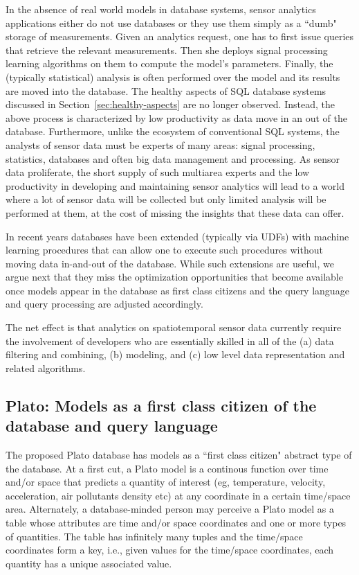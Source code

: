 In the absence of real world models in database systems, sensor analytics applications either do not use databases or they use them simply as a ``dumb" storage of measurements.
Given an analytics request, one has to first issue queries that retrieve the relevant measurements. Then she deploys signal processing learning algorithms on them to compute the model's parameters. Finally,  the (typically statistical) analysis is often performed over the model and its results are moved into the database. 
The healthy aspects of SQL database systems discussed in Section~\ref{sec:healthy-aspects} are no longer observed. Instead, the above process is characterized by low productivity as data move  in an out of the database. Furthermore, unlike the ecosystem of conventional SQL systems, the analysts of sensor data must be experts of many areas: signal processing, statistics, databases and often big data management and processing. As sensor data proliferate, the short supply of such multiarea experts and the low productivity in developing and maintaining sensor analytics will lead to a world where a lot of sensor data will be collected but only limited analysis will be performed at them, at the cost of missing the insights that these data can offer.


In recent years databases have been extended (typically via UDFs) with machine learning procedures that can allow one to execute such procedures without moving data in-and-out of the database. While such extensions are useful, we argue next that they miss the optimization opportunities that become available once models appear in the database as first class citizens and the query language and query processing are adjusted accordingly.

The net effect is that analytics on spatiotemporal sensor data currently require the involvement of developers who are essentially skilled in all of the (a) data filtering and combining, (b) modeling, and (c) low level data representation and related algorithms. 

\subsection{Plato: Models as a first class citizen of the database and query language}
\label{sec:plato}
The proposed Plato database has models as a ``first class citizen" abstract type of the database. At a first cut, a Plato model is a continous function over time and/or space that predicts a quantity of interest (eg, temperature, velocity, acceleration, air pollutants density etc) at any coordinate in a certain time/space area. Alternately, a database-minded person may perceive a Plato model as a table whose attributes are time and/or space coordinates and one or more types of quantities. The table has infinitely many tuples and the time/space coordinates form a key, i.e.,  given values for the time/space coordinates, each quantity has a unique associated value. 

